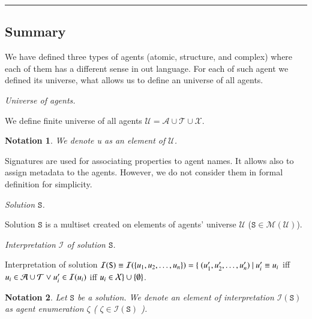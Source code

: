 \documentclass{elsarticle}
\newtheorem{notation}{Notation}
\begin{document}
\noindent\rule{\textwidth}{1pt}


\subsection{Summary}

We have defined three types of agents (atomic, structure, and complex) where each of them has a different sense in out language. For each of such agent we defined its universe, what allows us to define an universe of all agents.

\begin{definition}
\textit{Universe of agents.}

\noindent We define finite universe of all agents $\mathcal{U} = \mathcal{A} \cup \mathcal{T} \cup \mathcal{X}.$ 
\end{definition}

\begin{notation}
We denote \emph{u} as an element of $\mathcal{U}$.
\end{notation}

Signatures are used for associating properties to agent names. It allows also to assign metadata to the agents. However, we do not consider them in formal definition for simplicity.

\begin{definition}
\textit{Solution $\mathtt{S}$.}

\noindent Solution $\mathtt{S}$ is a multiset created on elements of agents' universe $\mathcal{U}$ ($\mathtt{S} \in \mathscr{M}(\mathcal{U})$).

\end{definition}

\begin{definition}
\textit{Interpretation $\mathcal{I}$ of solution $\mathtt{S}$.}

Interpretation of solution $\mathcal{I}(\mathtt{S}) \equiv \mathcal{I}(\{ \emph{u}_1, \emph{u}_2, \ldots, \emph{u}_n \}) = \{ ~(\emph{u}'_1, \emph{u}'_2, \ldots, \emph{u}'_n) ~|~ \emph{u}'_i \equiv \emph{u}_i$ iff $\emph{u}_i \in \mathcal{A} \cup \mathcal{T} \vee \emph{u}'_i \in \mathcal{I}(\emph{u}_i)$ iff $\emph{u}_i \in \mathcal{X} \} \cup \{ \emptyset \}$.
\end{definition}

\begin{notation}\label{agent_enum}
Let $\mathtt{S}$ be a solution. We denote an element of interpretation $\mathcal{I}(\mathtt{S})$ as \emph{agent enumeration} $\zeta$ ( $\zeta \in \mathcal{I}(\mathtt{S})$ ).
\end{notation}
\end{document}
